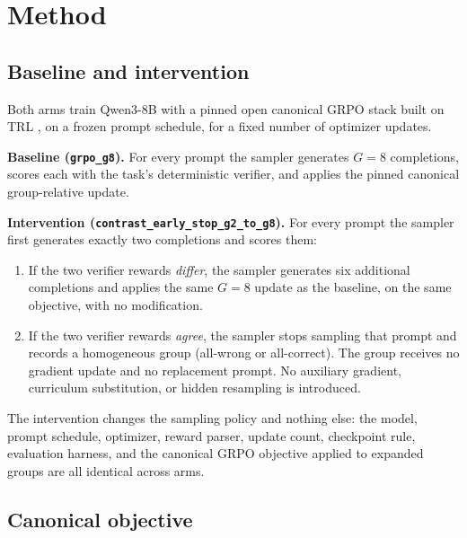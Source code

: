 \documentclass[11pt]{article}
\begin{document}
\section{Method}
\label{sec:method}

\subsection{Baseline and intervention}

Both arms train Qwen3-8B \citep{qwen3report2025} with a pinned open canonical GRPO stack built on TRL \citep{vonwerra2020trl}, on a frozen prompt schedule, for a fixed number of optimizer updates.

\textbf{Baseline (\texttt{grpo\_g8}).} For every prompt the sampler generates $G{=}8$ completions, scores each with the task's deterministic verifier, and applies the pinned canonical group-relative update.

\textbf{Intervention (\texttt{contrast\_early\_stop\_g2\_to\_g8}).} For every prompt the sampler first generates exactly two completions and scores them:
\begin{enumerate}
  \item If the two verifier rewards \emph{differ}, the sampler generates six additional completions and applies the same $G{=}8$ update as the baseline, on the same objective, with no modification.
  \item If the two verifier rewards \emph{agree}, the sampler stops sampling that prompt and records a homogeneous group (all-wrong or all-correct). The group receives no gradient update and no replacement prompt. No auxiliary gradient, curriculum substitution, or hidden resampling is introduced.
\end{enumerate}

The intervention changes the sampling policy and nothing else: the model, prompt schedule, optimizer, reward parser, update count, checkpoint rule, evaluation harness, and the canonical GRPO objective applied to expanded groups are all identical across arms.

\subsection{Canonical objective}
\end{document}
